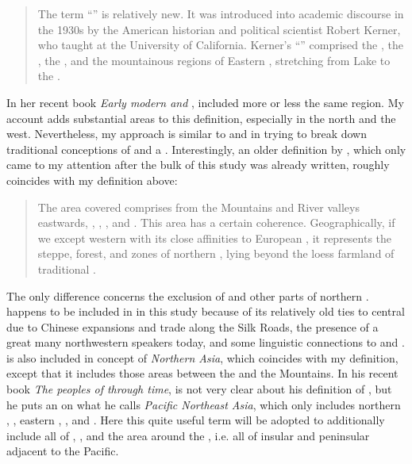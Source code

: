 \begin{quote}
The term “” is relatively new. It was introduced into academic discourse in the 1930s by the American historian and political scientist Robert Kerner, who taught at the University of California. Kerner’s “” comprised the , the , the , and the mountainous regions of Eastern , stretching from Lake  to the .
\end{quote}

\noindent In her recent book \textit{Early modern  and }, \citet{Rawski2015} included more or less the same region. My account adds substantial areas to this definition, especially in the north and the west. Nevertheless, my approach is similar to  and  in trying to break down traditional conceptions of  and a . Interestingly, an older definition by \citet[xv]{Chard1974}, which only came to my attention after the bulk of this study was already written, roughly coincides with my definition above:

\begin{quote}
The area covered comprises  from the  Mountains and  River valleys eastwards, , , , and . This area has a certain coherence. Geographically, if we except western  with its close affinities to European , it represents the steppe, forest, and  zones of northern , lying beyond the loess farmland of traditional .
\end{quote}

\noindent The only difference concerns the exclusion of  and other parts of northern .  happens to be included in  in this study because of its relatively old ties to central  due to Chinese expansions and trade along the Silk Roads, the presence of a great many northwestern  speakers today, and some linguistic connections to  and .  is also included in  concept of \textit{Northern Asia}, which coincides with my definition, except that it includes those areas between the  and the  Mountains. In his recent book \textit{The peoples of  through time}, \citet[21ff.]{Zgusta2015} is not very clear about his definition of , but he puts an  on what he calls \textit{Pacific Northeast Asia}, which only includes northern , , eastern , , and . Here this quite useful term will be adopted to additionally include all of , , and the area around the , i.e. all of insular and peninsular  adjacent to the Pacific.

